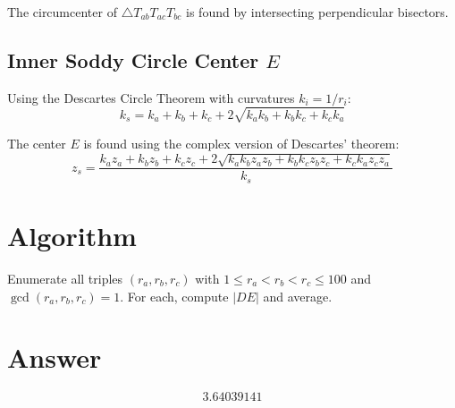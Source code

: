 \documentclass[12pt]{article}
\begin{document}
The circumcenter of $\triangle T_{ab}T_{ac}T_{bc}$ is found by intersecting perpendicular bisectors.

\subsection{Inner Soddy Circle Center $E$}

Using the Descartes Circle Theorem with curvatures $k_i = 1/r_i$:
\[
k_s = k_a + k_b + k_c + 2\sqrt{k_a k_b + k_b k_c + k_c k_a}
\]

The center $E$ is found using the complex version of Descartes' theorem:
\[
z_s = \frac{k_a z_a + k_b z_b + k_c z_c + 2\sqrt{k_a k_b z_a z_b + k_b k_c z_b z_c + k_c k_a z_c z_a}}{k_s}
\]

\section{Algorithm}

Enumerate all triples $(r_a, r_b, r_c)$ with $1 \leq r_a < r_b < r_c \leq 100$ and $\gcd(r_a, r_b, r_c) = 1$. For each, compute $|DE|$ and average.

\section{Answer}

\[
\boxed{3.64039141}
\]
\end{document}
